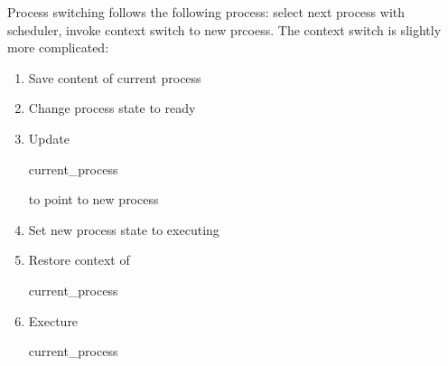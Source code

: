 \documentclass[12pt]{article}
\begin{document}
Process switching follows the following process: select next process with scheduler, invoke context switch to new prcoess. The context switch is slightly more complicated:
\begin{enumerate}
\item Save content of current process
\item Change process state to ready
\item Update \begin{code}current\_process\end{code} to point to new process
\item Set new process state to executing
\item Restore context of \begin{code}current\_process\end{code}
\item Execture \begin{code}current\_process\end{code}
\end{enumerate}
\end{document}
